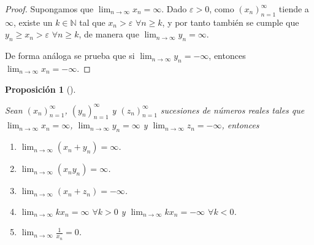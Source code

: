 \documentclass[
  a4paper,
]{scrreport}
\providecommand{\tightlist}{%
  \setlength{\itemsep}{0pt}\setlength{\parskip}{0pt}}\usepackage{longtable,booktabs,array}
\theoremstyle{definition}
\theoremstyle{plain}
\theoremstyle{definition}
\theoremstyle{plain}
\theoremstyle{plain}
\newtheorem{proposition}{Proposición}[chapter]
\theoremstyle{remark}
\begin{document}
\begin{tcolorbox}[enhanced jigsaw, breakable, arc=.35mm, colbacktitle=quarto-callout-note-color!10!white, toptitle=1mm, opacityback=0, colframe=quarto-callout-note-color-frame, colback=white, left=2mm, bottomrule=.15mm, opacitybacktitle=0.6, title=\textcolor{quarto-callout-note-color}{\faInfo}\hspace{0.5em}{Demostración}, toprule=.15mm, titlerule=0mm, coltitle=black, rightrule=.15mm, bottomtitle=1mm, leftrule=.75mm]

\begin{proof}

Supongamos que \(\lim_{n\to\infty}x_n=\infty\). Dado \(\varepsilon>0\),
como \((x_n)_{n=1}^\infty\) tiende a \(\infty\), existe un
\(k\in\mathbb{N}\) tal que \(x_n>\varepsilon\) \(\forall n\geq k\), y
por tanto también se cumple que \(y_n\geq x_n>\varepsilon\)
\(\forall n\geq k\), de manera que \(\lim_{n\to\infty}y_n=\infty\).

De forma análoga se prueba que si \(\lim_{n\to\infty}y_n=-\infty\),
entonces \(\lim_{n\to\infty}x_n=-\infty\).

\end{proof}

\end{tcolorbox}

\leavevmode{}%
\begin{proposition}[]\label{prp-algebra-sucesiones-propiamentes-divergentes}

Sean \((x_n)_{n=1}^\infty\), \((y_n)_{n=1}^\infty\) y
\((z_n)_{n=1}^\infty\) sucesiones de números reales tales que
\(\lim_{n\to\infty}x_n=\infty\), \(\lim_{n\to\infty}y_n=\infty\) y
\(\lim_{n\to\infty}z_n=-\infty\), entonces

\begin{enumerate}
\def\labelenumi{\alph{enumi}.}
\tightlist
\item
  \(\lim_{n\to\infty}(x_n+y_n)=\infty\).
\item
  \(\lim_{n\to\infty}(x_ny_n)=\infty\).
\item
  \(\lim_{n\to\infty}(x_n+z_n)=-\infty\).
\item
  \(\lim_{n\to\infty}kx_n=\infty\) \(\forall k>0\) y
  \(\lim_{n\to\infty}kx_n=-\infty\) \(\forall k<0\).
\item
  \(\lim_{n\to\infty}\frac{1}{x_n}=0\).
\end{enumerate}

\end{proposition}
\end{document}
